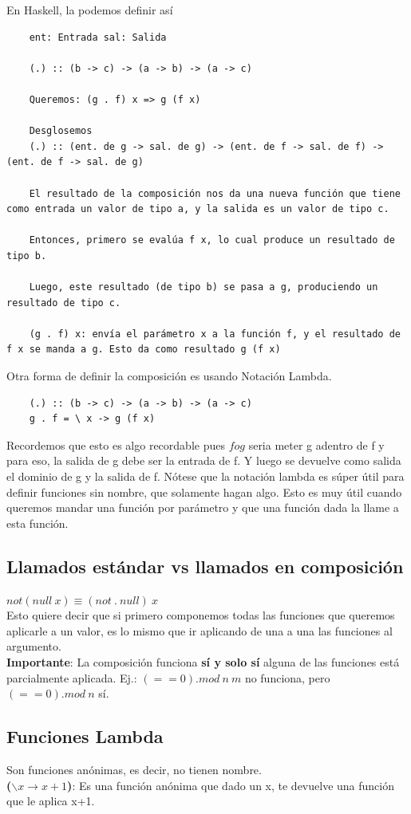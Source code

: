 \documentclass[10pt,a4paper]{article}
\begin{document}
En Haskell, la podemos definir así
\begin{lstlisting}
    ent: Entrada sal: Salida

    (.) :: (b -> c) -> (a -> b) -> (a -> c)
    
    Queremos: (g . f) x => g (f x) 

    Desglosemos
    (.) :: (ent. de g -> sal. de g) -> (ent. de f -> sal. de f) -> (ent. de f -> sal. de g)
    
    El resultado de la composición nos da una nueva función que tiene como entrada un valor de tipo a, y la salida es un valor de tipo c.
    
    Entonces, primero se evalúa f x, lo cual produce un resultado de tipo b.
    
    Luego, este resultado (de tipo b) se pasa a g, produciendo un resultado de tipo c.
  
    (g . f) x: envía el parámetro x a la función f, y el resultado de f x se manda a g. Esto da como resultado g (f x)
\end{lstlisting}
Otra forma de definir la composición es usando Notación Lambda.
\begin{lstlisting}
    (.) :: (b -> c) -> (a -> b) -> (a -> c)
    g . f = \ x -> g (f x)
\end{lstlisting}
Recordemos que esto es algo recordable pues $fog$ seria meter g adentro de f y para eso, la salida de g debe ser la entrada de f. Y luego se devuelve como salida el dominio de g y la salida de f.
Nótese que la notación lambda es súper útil para definir funciones sin nombre, que solamente hagan algo. Esto es muy útil cuando queremos mandar una función por parámetro y que una función dada la llame a esta función.
\subsection*{Llamados estándar vs llamados en composición}
$not(null \ x) \equiv (not \ . \ null) \ x$ \\
Esto quiere decir que si primero componemos todas las funciones que queremos aplicarle a un valor, es lo mismo que ir aplicando de una a una las funciones al argumento. \\
\textbf{Importante}: La composición funciona \textbf{sí y solo sí} alguna de las funciones está parcialmente aplicada. Ej.: $(== 0) . mod \ n \ m$ no funciona, pero $(== 0) . mod \ n$ sí.
\subsection*{Funciones Lambda}
Son funciones anónimas, es decir, no tienen nombre.  \\
\textbf{($\backslash x \rightarrow x+1$)}: Es una función anónima que dado un x, te devuelve una función que le aplica x+1.
\end{document}

